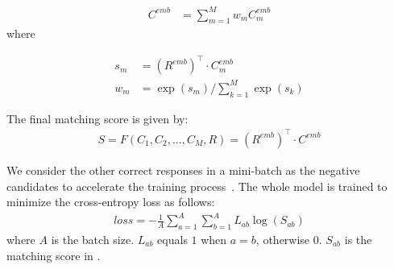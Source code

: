 \begin{equation}
\begin{aligned}
C^{emb}&=\sum_{m=1}^Mw_mC^{emb}_m
\end{aligned}
\end{equation}
where

\begin{equation}
\begin{aligned}
s_m &= (R^{emb})^\top \cdot C^{emb}_m\\
w_m &= \exp(s_m)/\sum_{k=1}^M\exp(s_k)
\end{aligned}
\end{equation}

The final matching score is given by:
\begin{equation}
\begin{aligned}
S = F(C_1, C_2, ..., C_M, R) = (R^{emb})^\top\cdot C^{emb}
\end{aligned}
\label{eq:matching_score}
\end{equation}

We consider the other correct responses in a mini-batch as the negative candidates to accelerate the training process~\cite{MazareHRB18}. The whole model is trained to minimize the cross-entropy loss as follows:
\begin{equation}
\begin{aligned}
loss = - \frac{1}{A}\sum_{a=1}^{A}\sum_{b=1}^{A} L_{ab}\log(S_{ab})
\end{aligned}
\end{equation}
where $A$ is the batch size. $L_{ab}$ equals $1$ when $a=b$, otherwise $0$. $S_{ab}$ is the matching score in .

